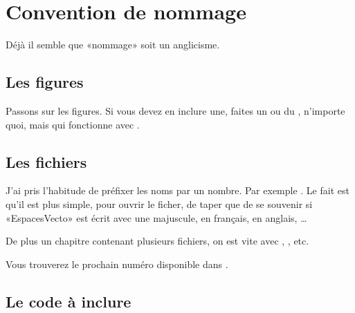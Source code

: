 \section{Convention de nommage}

Déjà il semble que «nommage» soit un anglicisme.

\subsection{Les figures}

Passons sur les figures. Si vous devez en inclure une, faites un  ou du , n'importe quoi, mais qui fonctionne avec .

\subsection{Les fichiers }

J'ai pris l'habitude de préfixer les noms par un nombre. Par exemple . Le fait est qu'il est plus simple, pour ouvrir le ficher, de taper  que de se souvenir si «EspacesVecto» est écrit avec une majuscule, en français, en anglais, \ldots 

De plus un chapitre contenant plusieurs fichiers, on est vite avec , , etc.

Vous trouverez le prochain numéro disponible dans .

\subsection{Le code à inclure}


